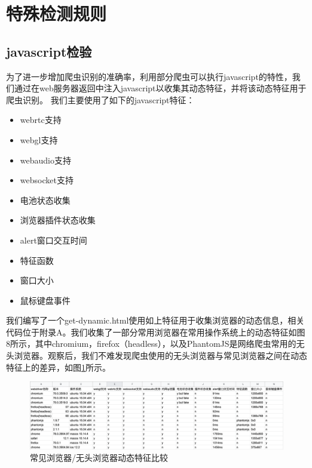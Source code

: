 \documentclass[doctor,privacy,twoside]{buaa_mac}
\begin{document}
\section{特殊检测规则}
\subsection{javascript检验}

为了进一步增加爬虫识别的准确率，利用部分爬虫可以执行javascript的特性，我们通过在web服务器返回中注入javascript以收集其动态特征，并将该动态特征用于爬虫识别。
我们主要使用了如下的javascript特征：

\begin{itemize}
\item webrtc支持
\item webgl支持
\item webaudio支持
\item websocket支持
\item 电池状态收集
\item 浏览器插件状态收集
\item alert窗口交互时间
\item 特征函数
\item 窗口大小
\item 鼠标键盘事件
\end{itemize}

我们编写了一个get-dynamic.html使用如上特征用于收集浏览器的动态信息，相关代码位于附录A。我们收集了一部分常用浏览器在常用操作系统上的动态特征如图8所示，其中chromium，firefox（headless），以及PhantomJS是网络爬虫常用的无头浏览器。观察后，我们不难发现爬虫使用的无头浏览器与常见浏览器之间在动态特征上的差异，如图\ref{fig:dynamic}所示。

\centerline{}
\begin{figure}[!h]
  \centering
  \includegraphics[width=1\textwidth]{images/dynamic_features.png}
  \caption{常见浏览器/无头浏览器动态特征比较}
  \label{fig:dynamic}
\end{figure}
\centerline{}
\end{document}
